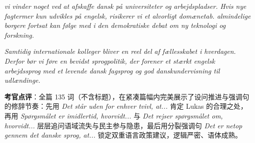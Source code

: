 \begin{answerbox}
\textit{ vi vinder noget ved at afskaffe dansk på universiteter og arbejdspladser. Hvis nye fagtermer kun udvikles på engelsk, risikerer vi et alvorligt domænetab.  almindelige borgere fortsat kan følge med i den demokratiske debat om ny teknologi og forskning.}

\textit{Samtidig  internationale kolleger bliver en reel del af fællesskabet i hverdagen. Derfor bør vi føre en bevidst sprogpolitik, der forener et stærkt engelsk arbejdssprog med et levende dansk fagsprog og god danskundervisning til udlændinge.}

\small\textbf{考官点评}：全篇 135 词（不含标题），在紧凑篇幅内完美展示了设问推进与强调句的修辞节奏：先用 \textit{Det står uden for enhver tvivl, at...} 肯定 Lukas 的合理之处，再用 \textit{Spørgsmålet er imidlertid, hvorvidt...} 与 \textit{Det rejser spørgsmålet om, hvorvidt...} 层层追问语域流失与民主参与隐患，最后用分裂强调句 \textit{Det er netop gennem det danske sprog, at...} 锁定双重语言政策建议，逻辑严密、语体成熟。
\end{answerbox}
